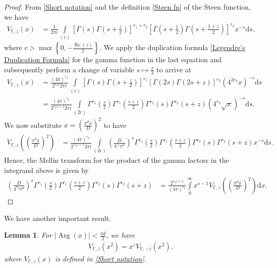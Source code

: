 \documentclass[12pt,reqno]{amsart}
\newcommand{\Arg}{\operatorname{Arg}}
\renewcommand{\Re}{\operatorname{Re}}
\renewcommand{\(}{\left\(}
\renewcommand{\)}{\right\)}
\renewcommand{\[}{\left\[}
\renewcommand{\]}{\right\]}
\numberwithin{equation}{section}
\theoremstyle{plain}
\newtheorem{lemma}[theorem]{Lemma}
\begin{document}
\begin{proof}
From \eqref{Short notation} and the definition \eqref{Steen fn} of the Steen function, we have
\begin{align*}
V_{\mathbb{F},z}\left(x\right)
&= \frac{1}{2\pi i}\int\limits_{(c)}\left[\Gamma(s)\Gamma\left(s+\frac{z}{2}\right)\right]^{r_1+r_2}\!\left[\Gamma\left(s+\frac{1}{2}\right)\Gamma\left(s+\frac{1+z}{2}\right)\right]^{r_2}\!x^{-s} \textrm{d}s,
\end{align*}
where $c > \max\left\{0, -\frac{\Re(z)}{2}\right\}$.
We apply the duplication formula \eqref{Legendre's Duplication Formula} for the gamma function in the last equation and subsequently perform a change of variable $s \mapsto \frac{s}{2}$ to arrive at
\begin{align*}
V_{\mathbb{F},z}\left(x\right)
&= \frac{(4\pi)^{r_2}}{2^{r_2 z} 2\pi i}{\displaystyle\int\limits_{(c)}\!\left[\Gamma(s)\Gamma\left(s+\frac{z}{2}\right)\right]^{r_1}\!\left[\Gamma(2s)\Gamma(2s+z)\right]^{r_2}(4^{2r_2}x)^{-s}\textrm{d}s}\\
&= \frac{(4\pi)^{r_2}}{2^{r_2 z + 1} 2\pi i}{\displaystyle\int\limits_{(2c)}\!\Gamma^{r_1}\left(\frac{s}{2}\right)\Gamma^{r_1}\left(\frac{s+z}{2}\right)\Gamma^{r_2}(s)\Gamma^{r_2}(s+z)(4^{r_2}\sqrt{x})^{-s}\textrm{d}s}.
\end{align*}
We now substitute $x = \left(\frac{\pi^{d} x}{D}\right)^2$ to have
\begin{align}\label{Inverse Mellin}
V_{\mathbb{F},z}\left(\left(\frac{\pi^{d} x}{D}\right)^2\right)
&= \frac{(4\pi)^{r_2}}{2^{r_2 z + 1}2\pi i}{\displaystyle\int\limits_{(2c)}\!\left(\frac{D}{4^{r_2}\pi^{d}}\right)^{s}\Gamma^{r_1}\left(\frac{s}{2}\right)\Gamma^{r_1}\left(\frac{s+z}{2}\right)\Gamma^{r_2}(s)\Gamma^{r_2}(s+z)x^{-s}\textrm{d}s}.
\end{align}
Hence, the Mellin transform for the product of the gamma factors in the integrand above is given by
\begin{align*}
\left(\frac{D}{4^{r_2}\pi^{d}}\right)^{s}\Gamma^{r_1}\left(\frac{s}{2}\right)\Gamma^{r_1}\left(\frac{s+z}{2}\right)\Gamma^{r_2}(s)\Gamma^{r_2}(s+z)
&= \frac{2^{r_2 z + 1}}{(4\pi)^{r_2}}\int\limits_{0}^\infty x^{s-1}V_{\mathbb{F},z}\left(\left(\frac{\pi^{d} x}{D}\right)^2\right) \mathrm{d}x.
\end{align*}
\end{proof}
We have another important result.
\begin{lemma}\label{Lemma reln bw V_z and V_-z}
For $|\Arg(x)| < \frac{\pi d}{2}$, we have
\begin{align}
V_{\mathbb{F},z}\left(x^2\right)
= x^{z}V_{\mathbb{F},-z}\left(x^2\right), \label{V_z and V_-z}
\end{align}
where $V_{\mathbb{F},z}(x)$ is defined in \eqref{Short notation}.
\end{lemma}
\end{document}
